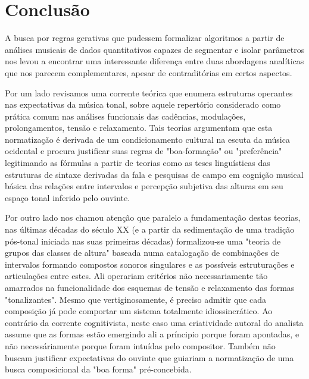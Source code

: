 \documentclass[
	12pt,				%
	openright,			%
	twoside,			%
	a4paper,			%
	english,			%
	french,				%
	spanish,			%
	brazil				%
	]{abntex2}
\begin{document}



\chapter*[Conclusão]{Conclusão}
\label{conclusao}


A busca por regras gerativas\cite{roads1979grammars} que pudessem formalizar algoritmos a partir de análises musicais de dados quantitativos capazes de segmentar e isolar parâmetros nos levou a encontrar uma interessante diferença entre duas abordagens analíticas que nos parecem complementares, apesar de contraditórias em certos aspectos.

Por um lado revisamos uma corrente teórica que enumera estruturas operantes nas expectativas da música tonal, sobre aquele repertório considerado como prática comum nas análises funcionais das cadências, modulações, prolongamentos, tensão e relaxamento. Tais teorias argumentam que esta normatização é derivada de um condicionamento cultural na escuta da música ocidental e procura justificar suas regras de "boa-formação" ou "preferência"\cite{lerdahl1983generative,temperley2001cognition} legitimando as fórmulas a partir de teorias como as teses linguísticas das estruturas de sintaxe derivadas da fala\cite{chomsky1957syntactic} e pesquisas de campo em cognição musical básica das relações entre intervalos e percepção subjetiva das alturas em seu espaço tonal inferido pelo ouvinte\cite{krumhansl1990cognitive,lerdahl2001tonal}. 

Por outro lado nos chamou atenção que paralelo a fundamentação destas teorias, nas últimas décadas do século XX (e a partir da sedimentação de uma tradição pós-tonal iniciada nas suas primeiras décadas) formalizou-se uma "teoria de grupos das classes de altura"\cite{forte1973structure,rahn1980basic,perle1990pitch,straus2004} baseada numa catalogação de combinações de intervalos formando compostos sonoros singulares e as possíveis estruturações e articulações entre estes. Ali operariam critérios não necessariamente tão amarrados na funcionalidade dos esquemas de tensão e relaxamento das formas "tonalizantes". Mesmo que vertiginosamente, é preciso admitir que cada composição já pode comportar um sistema totalmente idiossincrático. Ao contrário da corrente cognitivista, neste caso uma criatividade autoral do analista assume que as formas estão emergindo ali a príncipio porque foram apontadas, e não necessáriamente porque foram intuídas pelo compositor. Também não buscam justificar expectativas do ouvinte que guiariam a normatização de uma busca composicional da "boa forma" pré-concebida.\cite{babbitt1958cares}
\end{document}
